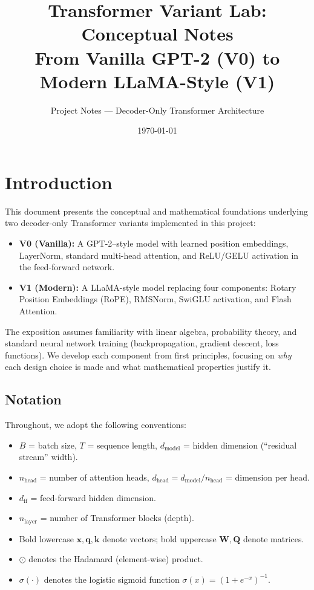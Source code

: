 \documentclass[11pt, a4paper]{article}
\title{\textbf{Transformer Variant Lab: Conceptual Notes} \\[0.5em]
\large From Vanilla GPT-2 (V0) to Modern LLaMA-Style (V1)}
\author{Project Notes — Decoder-Only Transformer Architecture}
\date{\today}
\theoremstyle{definition}
\newcommand{\vx}{\bm{x}}
\newcommand{\vq}{\bm{q}}
\newcommand{\vk}{\bm{k}}
\newcommand{\mW}{\bm{W}}
\newcommand{\mQ}{\bm{Q}}
\newcommand{\dmodel}{d_{\text{model}}}
\newcommand{\dhead}{d_{\text{head}}}
\newcommand{\dff}{d_{\text{ff}}}
\newcommand{\nhead}{n_{\text{head}}}
\newcommand{\nlayer}{n_{\text{layer}}}
\begin{document}
\maketitle
\tableofcontents
\newpage

\section{Introduction}

This document presents the conceptual and mathematical foundations underlying two decoder-only Transformer variants implemented in this project:

\begin{itemize}
    \item \textbf{V0 (Vanilla):} A GPT-2--style model with learned position embeddings, LayerNorm, standard multi-head attention, and ReLU/GELU activation in the feed-forward network.
    \item \textbf{V1 (Modern):} A LLaMA-style model replacing four components: Rotary Position Embeddings (RoPE), RMSNorm, SwiGLU activation, and Flash Attention.
\end{itemize}

The exposition assumes familiarity with linear algebra, probability theory, and standard neural network training (backpropagation, gradient descent, loss functions). We develop each component from first principles, focusing on \emph{why} each design choice is made and what mathematical properties justify it.

\subsection{Notation}

Throughout, we adopt the following conventions:
\begin{itemize}[nosep]
    \item $B$ = batch size, $T$ = sequence length, $\dmodel$ = hidden dimension (``residual stream'' width).
    \item $\nhead$ = number of attention heads, $\dhead = \dmodel / \nhead$ = dimension per head.
    \item $\dff$ = feed-forward hidden dimension.
    \item $\nlayer$ = number of Transformer blocks (depth).
    \item Bold lowercase $\vx, \vq, \vk$ denote vectors; bold uppercase $\mW, \mQ$ denote matrices.
    \item $\odot$ denotes the Hadamard (element-wise) product.
    \item $\sigma(\cdot)$ denotes the logistic sigmoid function $\sigma(x) = (1 + e^{-x})^{-1}$.
\end{itemize}
\end{document}
